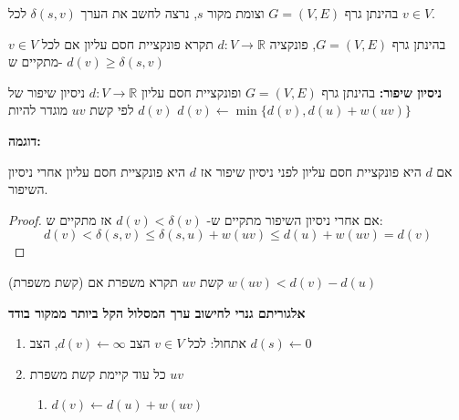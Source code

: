 בהינתן גרף 
$G = (V, E)$
וצומת מקור $s$,
נרצה לחשב את הערך 
$\delta(s,v)$
לכל 
$v \in V$.

\begin{definition}
בהינתן גרף 
$G = (V, E)$,
פונקציה 
$d:V \to \mathbb{R}$
תקרא פונקציית חסם עליון אם לכל 
$v \in V$
מתקיים ש-%
$d(v) \geq \delta(s,v)$
\end{definition}

\textbf{ניסיון שיפור:}
בהינתן גרף 
$G = (V,E)$
ופונקציית חסם עליון 
$d:V \to \mathbb{R}$
ניסיון שיפור של
$d(v)$
לפי קשת $uv$ מוגדר להיות
$d(v) \leftarrow \min\{d(v), d(u) + w(uv)\}$

\textbf{דוגמה:}
\begin{center}
\end{center}

\begin{claim}
אם $d$ היא פונקציית חסם עליון לפני ניסיון שיפור אז $d$ היא פונקציית חסם עליון אחרי ניסיון השיפור.
\end{claim}
\begin{proof}
אם אחרי ניסיון השיפור מתקיים ש-%
$d(v) < \delta(v)$
אז מתקיים ש:%
$$d(v) < \delta(s,v) \leq \delta(s,u) + w(uv) \leq d(u) + w(uv) = d(v)$$

\end{proof}

\begin{definition}(קשת משפרת)
קשת
$uv$
תקרא משפרת אם
$w(uv) < d(v) - d(u)$
\end{definition}


\textbf{
אלגוריתם גנרי לחישוב ערך המסלול הקל ביותר ממקור בודד
}

\begin{enumerate}
\item
אתחול:
לכל 
$v \in V$
הצב
$d(v) \leftarrow \infty$,
הצב
$d(s) \leftarrow 0$
\item
כל עוד קיימת קשת משפרת 
$uv$
\begin{enumerate}
\item
$d(v) \leftarrow d(u) + w(uv)$
\end{enumerate}
\end{enumerate}

